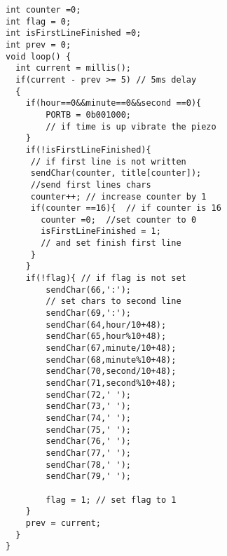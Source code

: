 \documentclass[pdftex,12pt,a4paper]{article}
\begin{document}
\begin{flushleft}
\begin{lstlisting}[language=Arduino]
int counter =0;
int flag = 0;
int isFirstLineFinished =0;
int prev = 0;
void loop() {
  int current = millis();
  if(current - prev >= 5) // 5ms delay
  {
    if(hour==0&&minute==0&&second ==0){
    	PORTB = 0b001000; 
      	// if time is up vibrate the piezo
  	}
  	if(!isFirstLineFinished){ 
     // if first line is not written                      
     sendChar(counter, title[counter]);	
     //send first lines chars
     counter++; // increase counter by 1
     if(counter ==16){	// if counter is 16
       counter =0;	//set counter to 0
       isFirstLineFinished = 1;	
       // and set finish first line
     } 
  	}
  	if(!flag){ // if flag is not set
    	sendChar(66,':'); 
      	// set chars to second line
    	sendChar(69,':');
   		sendChar(64,hour/10+48);
   		sendChar(65,hour%10+48);
   		sendChar(67,minute/10+48);
   		sendChar(68,minute%10+48);
   		sendChar(70,second/10+48);
   		sendChar(71,second%10+48);
   		sendChar(72,' ');
   		sendChar(73,' ');
   		sendChar(74,' ');
    	sendChar(75,' ');
   		sendChar(76,' ');
   		sendChar(77,' ');
   		sendChar(78,' ');
   		sendChar(79,' ');

   		flag = 1; // set flag to 1
  	}
    prev = current;
  }
}
\end{lstlisting}


\end{flushleft}
\end{document}
